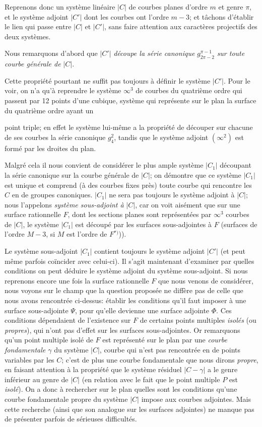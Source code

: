 \documentclass{article}
\begin{document}
Reprenons donc un système linéaire $|C|$ de courbes planes d'ordre $m$ et genre $\pi$, et le système adjoint $|C'|$ dont les courbes ont l'ordre $m-3$; et tâchons d'établir le lien qui passe entre $|C|$ et $|C'|$, sans faire attention aux caractères projectifs des deux systèmes.

Nous remarquons d'abord que $|C'|$ \emph{découpe la série canonique} $g_{2\pi-2}^{\pi-1}$ \emph{sur toute courbe générale de} $|C|$.

Cette propriété pourtant ne suffit pas toujours à définir le système $|C'|$. Pour le voir, on n'a qu'à reprendre le système $\infty^{3}$ de courbes du quatrième ordre qui passent par 12 points d'une cubique, système qui représente sur le plan la surface du quatrième ordre ayant un

point triple; en effet le système lui-même a la propriété de découper sur chacune de ses courbes la série canonique $g_{4}^{2}$, tandis que le système adjoint $(\infty^{2})$ est formé par les droites du plan.

Malgré cela il nous convient de considérer le plus ample système $|C_{1}|$ découpant la série canonique sur la courbe générale de $|C|$; on démontre que ce système $|C_{1}|$ est unique et comprend (à des courbes fixes près) toute courbe qui rencontre les $C$ en de groupes canoniques. $|C_{1}|$ ne sera pas toujours le système adjoint à $|C|$; nous l'appelons \emph{système sous-adjoint à} $|C|$, car on voit aisément que sur une surface rationnelle $F$, dont les sections planes sont représentées par $\infty^{3}$ courbes de $|C|$, le système $|C_{1}|$ est découpé par les surfaces sous-adjointes à $F$ (surfaces de l'ordre $M-3$, si $M$ est l'ordre de $F$${}^{*)}$)).

Le système sous-adjoint $|C_{1}|$ contient toujours le système adjoint $|C'|$ (et peut même parfois coïncider avec celui-ci). Il s'agit maintenant d'examiner par quelles conditions on peut déduire le système adjoint du système sous-adjoint. Si nous reprenons encore une fois la surface rationnelle $F$ que nous venons de considérer, nous voyons sur le champ que la question proposée ne diffère pas de celle que nous avons rencontrée ci-dessus: établir les conditions qu'il faut imposer à une surface sous-adjointe $\Psi$, pour qu'elle devienne une surface adjointe $\Phi$. Ces conditions dépendaient de l'existence sur $F$ de certains points multiples \emph{isolés} (ou \emph{propres}), qui n'ont pas d'effet sur les surfaces sous-adjointes. Or remarquons qu'un point multiple isolé de $F$ est représenté sur le plan par une \emph{courbe fondamentale $\gamma$} du système $|C|$, courbe qui n'est pas rencontrée en de points variables par les $C$; c'est de plus une courbe fondamentale que nous dirons \emph{propre}, en faisant attention à la propriété que le système résiduel $|C-\gamma|$ a le genre inférieur au genre de $|C|$ (en relation avec le fait que le point multiple $P$ est \emph{isolé}). On a donc à rechercher sur le plan quelles sont les conditions qu'une courbe fondamentale propre du système $|C|$ impose aux courbes adjointes. Mais cette recherche (ainsi que son analogue sur les surfaces adjointes) ne manque pas de présenter parfois de sérieuses difficultés.
\end{document}
